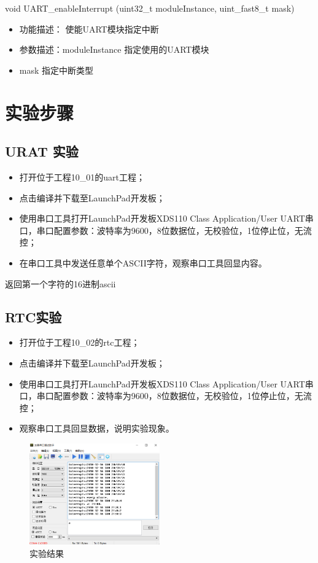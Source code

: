 \documentclass[a4paper,10pt,UTF8]{paper}
\numberwithin{equation}{section}
\numberwithin{figure}{section}
\begin{document}
\begin{ccode}
  void UART_enableInterrupt (uint32_t moduleInstance, 				   uint_fast8_t mask)
\end{ccode}

\begin{itemize}
  \item 功能描述： 使能UART模块指定中断
  \item 参数描述：moduleInstance	指定使用的UART模块
  \item mask			指定中断类型
\end{itemize}

\section{实验步骤}

\subsection{URAT 实验}

\begin{itemize}
  \item 打开位于工程10\_01的uart工程；
  \item 点击编译并下载至LaunchPad开发板；
  \item 使用串口工具打开LaunchPad开发板XDS110 Class Application/User UART串口，串口配置参数：波特率为9600，8位数据位，无校验位，1位停止位，无流控；
  \item 在串口工具中发送任意单个ASCII字符，观察串口工具回显内容。
\end{itemize}

返回第一个字符的16进制ascii

\subsection{RTC实验}

\begin{itemize}
  \item 打开位于工程10\_02的rtc工程；
  \item 点击编译并下载至LaunchPad开发板；
  \item 使用串口工具打开LaunchPad开发板XDS110 Class Application/User UART串口，串口配置参数：波特率为9600，8位数据位，无校验位，1位停止位，无流控；
  \item 观察串口工具回显数据，说明实验现象。
\end{itemize}

\begin{figure}[h]
  \centering
  \includegraphics[width=0.5\textwidth]{img/4.PNG}
  \caption{实验结果}
  \label{fig:4}
\end{figure}
\end{document}
